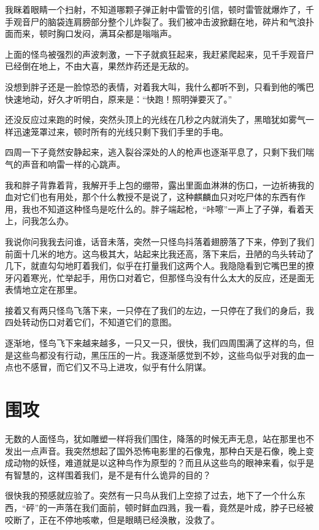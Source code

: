 我眯着眼睛一个扫射，不知道哪颗子弹正射中雷管的引信，顿时雷管就爆炸了，千手观音尸的脑袋连肩膀部分整个儿炸裂了。我们被冲击波掀翻在地，碎片和气浪扑面而来，顿时胸口发闷，满耳朵都是嗡嗡声。

上面的怪鸟被强烈的声波刺激，一下子就疯狂起来，我赶紧爬起来，见千手观音尸已经倒在地上，不由大喜，果然炸药还是无敌的。

没想到胖子还是一脸惊恐的表情，对着我大叫，我什么都听不到，只看到他的嘴巴快速地动，好久才听明白，原来是：“快跑！照明弹要灭了。”

还没反应过来跑的时候，突然头顶上的光线在几秒之内就消失了，黑暗犹如雾气一样迅速笼罩过来，顿时所有的光线只剩下我们手里的手电。

四周一下子竟然安静起来，逃入裂谷深处的人的枪声也逐渐平息了，只剩下我们喘气的声音和响雷一样的心跳声。

我和胖子背靠着背，我解开手上包的绷带，露出里面血淋淋的伤口，一边祈祷我的血对它们也有用处，那个什么教授不是说了，这种麒麟血只对吃尸体的东西有作用，我也不知道这种怪鸟是吃什么的。胖子端起枪，“咔嚓”一声上了子弹，看着天上，问我怎么办。

我说你问我我去问谁，话音未落，突然一只怪鸟抖落着翅膀落了下来，停到了我们前面十几米的地方。这鸟极其大，站起来比我还高，落下来后，丑陋的鸟头转动了几下，就直勾勾地盯着我们，似乎在打量我们这两个人。我隐隐看到它嘴巴里的撩牙闪着寒光，忙举起手，用伤口对着它，但那怪鸟没有什么太大的反应，还是面无表情地立定在那里。

接着又有两只怪鸟飞落下来，一只停在了我们的左边，一只停在了我们的身后，我四处转动伤口对着它们，不知道它们的意图。

逐渐地，怪鸟飞下来越来越多，一只又一只，很快，我们四周围满了这样的鸟，但是这些鸟都没有行动，黑压压的一片。我逐渐感觉到不妙，这些鸟似乎对我的血一点也不感冒，而它们又不马上进攻，似乎有什么阴谋。

\chapter{围攻}

无数的人面怪鸟，犹如雕塑一样将我们围住，降落的时候无声无息，站在那里也不发出一点声音。我突然想起了国外恐怖电影里的石像鬼，那种白天是石像，晚上变成动物的妖怪，难道就是以这种鸟作为原型的？而且从这些鸟的眼神来看，似乎是有智慧的，这样围着我们，是不是有什么诡异的目的？

很快我的预感就应验了。突然有一只鸟从我们上空掠了过去，地下了一个什么东西，“砰”的一声落在我们面前，顿时鲜血四溅，我一看，竟然是叶成，脖子已经被咬断了，正在不停地咳嗽，但是眼睛已经涣散，没救了。

